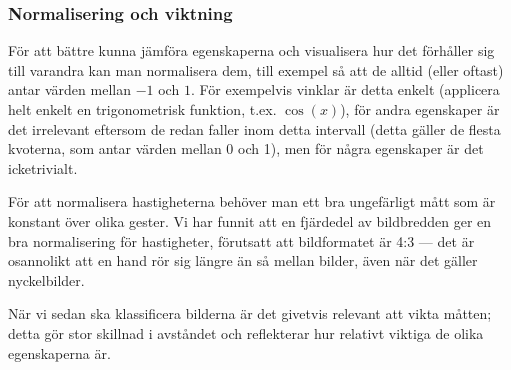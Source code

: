 \documentclass[../rapport_MVEX01-11-05]{subfiles}
\begin{document}
\subsubsection{Normalisering och viktning}

För att bättre kunna jämföra egenskaperna och visualisera hur det
förhåller sig till varandra kan man normalisera dem, till exempel så
att de alltid (eller oftast) antar värden mellan $-1$ och $1$. För
exempelvis vinklar är detta enkelt (applicera helt enkelt en
trigonometrisk funktion, t.ex. $\cos(x)$), för andra egenskaper är det
irrelevant eftersom de redan faller inom detta intervall (detta gäller
de flesta kvoterna, som antar värden mellan 0 och 1), men för några
egenskaper är det icketrivialt.

För att normalisera hastigheterna behöver man ett bra ungefärligt mått
som är konstant över olika gester. Vi har funnit att en fjärdedel av
bildbredden ger en bra normalisering för hastigheter, förutsatt att
bildformatet är 4:3 --- det är osannolikt att en hand rör sig längre
än så mellan bilder, även när det gäller nyckelbilder.

När vi sedan ska klassificera bilderna är det givetvis relevant att
vikta måtten; detta gör stor skillnad i avståndet och reflekterar
hur relativt viktiga de olika egenskaperna är.

\end{document}
